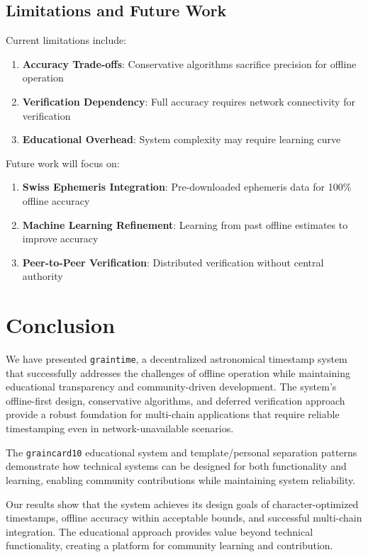 \documentclass[11pt]{article}
\newcommand{\graintime}{\texttt{graintime}}
\newcommand{\graincard}{\texttt{graincard10}}
\begin{document}
\subsection{Limitations and Future Work}

Current limitations include:

\begin{enumerate}
    \item \textbf{Accuracy Trade-offs}: Conservative algorithms sacrifice precision for offline operation
    \item \textbf{Verification Dependency}: Full accuracy requires network connectivity for verification
    \item \textbf{Educational Overhead}: System complexity may require learning curve
\end{enumerate}

Future work will focus on:

\begin{enumerate}
    \item \textbf{Swiss Ephemeris Integration}: Pre-downloaded ephemeris data for 100\% offline accuracy
    \item \textbf{Machine Learning Refinement}: Learning from past offline estimates to improve accuracy
    \item \textbf{Peer-to-Peer Verification}: Distributed verification without central authority
\end{enumerate}

\section{Conclusion}

We have presented \graintime, a decentralized astronomical timestamp system that successfully addresses the challenges of offline operation while maintaining educational transparency and community-driven development. The system's offline-first design, conservative algorithms, and deferred verification approach provide a robust foundation for multi-chain applications that require reliable timestamping even in network-unavailable scenarios.

The \graincard{} educational system and template/personal separation patterns demonstrate how technical systems can be designed for both functionality and learning, enabling community contributions while maintaining system reliability.

Our results show that the system achieves its design goals of character-optimized timestamps, offline accuracy within acceptable bounds, and successful multi-chain integration. The educational approach provides value beyond technical functionality, creating a platform for community learning and contribution.
\end{document}

